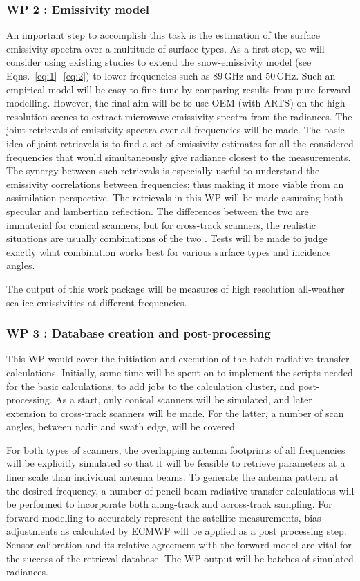 \documentclass[12pt,oneside,a4paper]{article}
\begin{document}
\subsubsection*{WP 2 : Emissivity model}
%
\label{sec:emissivity}
An important step to accomplish this task is the estimation of the surface emissivity spectra over a multitude of surface types. As a first step, we will consider using existing studies to extend the snow-emissivity model (see Eqns.~\ref{eq:1}- \ref{eq:2}) to lower frequencies such as 89\,GHz and 50\,GHz. Such an empirical model will be easy to fine-tune by comparing results from pure forward modelling. However, the final aim will be to use OEM (with ARTS) on the high-resolution scenes to extract microwave emissivity spectra from the radiances. The joint retrievals of emissivity spectra over all frequencies will be made. The basic idea of joint retrievals is to find a set of emissivity estimates for all the considered frequencies that would simultaneously give radiance closest to the measurements. The synergy between such retrievals is especially useful to understand the emissivity correlations between frequencies; thus making it more viable from an assimilation perspective. The retrievals in this WP will be made assuming both specular and lambertian reflection. The differences between the two are immaterial for conical scanners, but for cross-track scanners, the realistic situations are usually combinations of the two \citep{matzler:2005:onthe}. Tests will be made to judge exactly what combination works best for various surface types and incidence angles. 

The output of this work package will be measures of high resolution all-weather sea-ice emissivities at different frequencies. 
\vspace{-1.0ex}	
\subsubsection*{WP 3 : Database creation and post-processing}
%
\label{sec:database}	
This WP would cover the initiation and execution of the batch radiative transfer calculations. Initially, some time will be spent on to implement the scripts needed for the basic calculations, to add jobs to the calculation cluster, and post-processing. As a start, only conical scanners will be simulated, and later extension to cross-track scanners will be made. For the latter, a number of scan angles, between nadir and swath edge, will be covered.

For both types of scanners, the overlapping antenna footprints of all frequencies will be explicitly simulated so that it will be feasible to retrieve parameters at a finer scale than individual antenna beams. To generate the antenna pattern at the desired frequency, a number of pencil beam radiative transfer calculations will be performed to incorporate both along-track and across-track sampling. For forward modelling to accurately represent the satellite measurements, bias adjustments as calculated by ECMWF will be applied as a post processing step. Sensor calibration and its relative agreement with the forward model are vital for the success of the retrieval database. 
The WP output will be batches of simulated radiances.
\vspace{-1.0ex}
\end{document}
